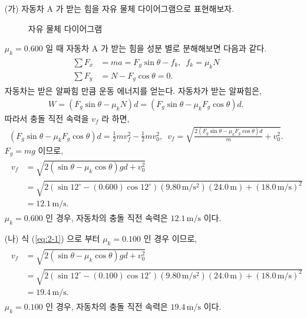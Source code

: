 \documentclass[fleqn,10pt]{article}%
\begin{document}
\begin{itemize}
  \item[(가)] 자동차 A 가 받는 힘을 자유 물체 다이어그램으로 
표현해보자.
\begin{figure}[h]
  \centering
  \caption{자유 물체 다이어그램}
\end{figure}
$\mu_k=0.600$ 일 때 자동차 A 가 받는 힘을 성분 별로 분해해보면 다음과 같다.
\begin{align}
  \begin{split}
    \sum F_x&=ma=F_g\sin{\theta}-f_k,\,\,\,f_k=\mu_k N \\
    \sum F_y&=N-F_g\cos{\theta}=0.
  \end{split}
\end{align}
자동차는 받은 알짜힘 만큼 운동 에너지를 얻는다. 자동차가 받는 알짜힘은,
\begin{align}
  W = (F_g\sin{\theta}-\mu_k N)d=(F_g\sin{\theta}-\mu_kF_g\cos{\theta})d.
\end{align}
따라서 충돌 직전 속력을 $v_f$ 라 하면,
\begin{align}
  (F_g\sin{\theta}-\mu_kF_g\cos{\theta})d 
  = \frac{1}{2}mv^2_f-\frac{1}{2}mv^2_0,\,\,\,
  v_f =\sqrt{\frac{2(F_g\sin{\theta}-\mu_kF_g\cos{\theta})d}{m} 
  +v^2_0}.
\end{align}
$F_g=mg$ 이므로,
\begin{align}\label{eq:2-1}
  \begin{split}
    v_f &= \sqrt{2(\sin{\theta}-\mu_k \cos{\theta})gd 
    +v^2_0} \\
    &= \sqrt{2(\sin{12^\circ}-(0.600) \cos{12^\circ})
    (9.80\,\mathrm{m/s^2})(24.0\,\mathrm{m}) 
    +(18.0\,\mathrm{m/s})^2} \\
    &= 12.1\,\mathrm{m/s}.
  \end{split}
\end{align}
$\mu_k=0.600$ 인 경우, 자동차의 충돌 직전 속력은 $12.1\,\mathrm{m/s}$ 이다.
\item[(나)] 식 (\ref{eq:2-1}) 으로 부터 $\mu_k=0.100$ 인 경우 이므로,
\begin{align}
  \begin{split}
    v_f &= \sqrt{2(\sin{\theta}-\mu_k \cos{\theta})gd 
    +v^2_0} \\
    &= \sqrt{2(\sin{12^\circ}-(0.100) \cos{12^\circ})
    (9.80\,\mathrm{m/s^2})(24.0\,\mathrm{m}) 
    +(18.0\,\mathrm{m/s})^2} \\
    &= 19.4\,\mathrm{m/s}.
  \end{split}
\end{align}
$\mu_k=0.100$ 인 경우, 자동차의 충돌 직전 속력은 $19.4\,\mathrm{m/s}$ 이다.
\end{itemize}
\end{document}
